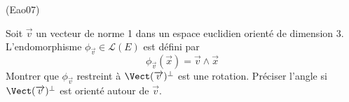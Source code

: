 \begin{tiny}(Eao07)\end{tiny}
Soit $\overrightarrow{v}$ un vecteur de norme 1 dans un espace euclidien orienté de dimension 3.\newline
L'endomorphisme $\phi _{\overrightarrow{v}} \in \mathcal{L}(E)$ est défini par
\begin{displaymath}
 \phi_{\overrightarrow{v}}(\overrightarrow{x}) = \overrightarrow{v}\wedge \overrightarrow{x}
\end{displaymath}
Montrer que $\phi _{\overrightarrow{v}}$ restreint {à} $\Vect(\overrightarrow{v})^{\perp }$ est une rotation. Préciser l'angle si $\Vect(\overrightarrow{v})^{\perp }$ est orienté autour de $\overrightarrow{v}$.